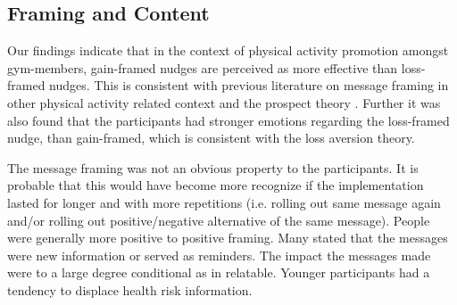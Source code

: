


\subsection{Framing and Content}
Our findings indicate that in the context of physical activity promotion amongst gym-members, gain-framed nudges are perceived as more effective than loss-framed nudges. This is consistent with previous literature on message framing in other physical activity related context and the prospect theory \cite{williams_effects_2019}.
Further it was also found that the participants had stronger emotions regarding the loss-framed nudge, than gain-framed, which is consistent with the loss aversion theory. 

The message framing was not an obvious property to the participants. It is probable that this would have become more recognize if the implementation lasted for longer and with more repetitions (i.e. rolling out same message again and/or rolling out positive/negative alternative of the same message). People were generally more positive to positive framing. Many stated that the messages were new information or served as reminders. The impact the messages made were to a large degree conditional as in relatable. Younger participants had a tendency to displace health risk information. 



